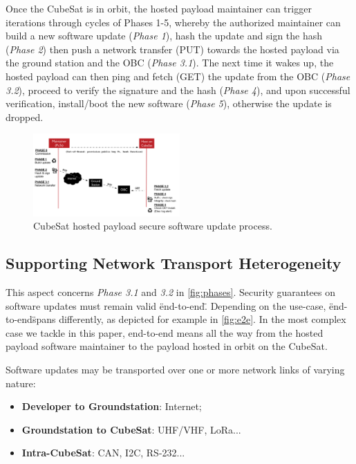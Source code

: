 Once the CubeSat is in orbit, the hosted payload maintainer can trigger iterations through cycles of Phases 1-5, whereby
the authorized maintainer can build a new software update (\textit{Phase 1}), hash the update
and sign the hash (\textit{Phase 2}) then push a network transfer (PUT) towards the hosted payload
via the ground station and the OBC (\textit{Phase 3.1}). The next time it wakes up, the hosted payload can
then ping and fetch (GET) the update from the OBC (\textit{Phase 3.2}), proceed to verify the signature and the hash (\textit{Phase 4}),
and upon successful verification, install/boot the new software (\textit{Phase 5}), otherwise the update is dropped.

\begin{figure}[t]
    \centering
    \includegraphics[width=0.5\textwidth]{Figures/CubeSat-Payload-update.png}
    \caption{CubeSat hosted payload secure software update process.}
    \label{fig:phases}
\end{figure}

\subsection{Supporting Network Transport Heterogeneity}
This aspect concerns \textit{Phase 3.1} and \textit{3.2} in \autoref{fig:phases}. Security guarantees on
software updates must remain valid \"end-to-end\". Depending on the use-case, \"end-to-end\" spans differently,
as depicted for example in \autoref{fig:e2e}. In the most complex case we tackle in this paper,
end-to-end means all the way from the hosted payload software maintainer to the payload hosted in orbit on the CubeSat.

Software updates may be transported over one or more network links of varying nature:
\begin{itemize}
\item {\bf Developer to Groundstation}: Internet;
\item {\bf Groundstation to CubeSat}: UHF/VHF, LoRa...
\item {\bf Intra-CubeSat}: CAN, I2C, RS-232...
\end{itemize}

